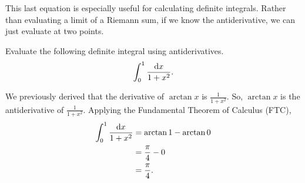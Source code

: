 This last equation is especially useful for calculating definite integrals.
Rather than evaluating a limit of a Riemann sum, if we know the antiderivative, we can just evaluate at two points.

\begin{example}
	Evaluate the following definite integral using antiderivatives.
	\begin{equation*}
		\int_{0}^{1}{\frac{\mathrm{d} x}{1+x^2}}.
	\end{equation*}
\end{example}
\begin{answer}
	We previously derived that the derivative of $\arctan{x}$ is $\frac{1}{1+x^2}$.
	So, $\arctan{x}$ is the antiderivative of $\frac{1}{1+x^2}$.
	Applying the Fundamental Theorem of Calculus (FTC),
	\begin{align*}
		\int_{0}^{1}{\frac{\mathrm{d} x}{1+x^2}} &= \arctan{1} - \arctan{0} \\
		&= \frac{\pi}{4} - 0 \\
		&= \frac{\pi}{4}.
	\end{align*} 
\end{answer}
